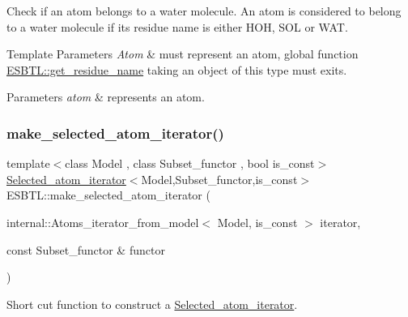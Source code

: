 Check if an atom belongs to a water molecule. An atom is considered to belong to a water molecule if its residue name is either {\ttfamily H\+OH}, {\ttfamily S\+OL} or {\ttfamily W\+AT}. 
\begin{DoxyTemplParams}{Template Parameters}
{\em Atom} & must represent an atom, global function \hyperlink{namespaceESBTL_ac67e09aee9aee533dd3953a094a52516}{E\+S\+B\+T\+L\+::get\+\_\+residue\+\_\+name} taking an object of this type must exits. \\
\hline
\end{DoxyTemplParams}

\begin{DoxyParams}{Parameters}
{\em atom} & represents an atom. \\
\hline
\end{DoxyParams}
\mbox{\label{namespaceESBTL_a1f356c0519634420b8c43f23a0513402}} 
\subsubsection{\texorpdfstring{make\+\_\+selected\+\_\+atom\+\_\+iterator()}{make\_selected\_atom\_iterator()}\hspace{0.1cm}{\footnotesize\ttfamily [1/2]}}
{\footnotesize\ttfamily template$<$class Model , class Subset\+\_\+functor , bool is\+\_\+const$>$ \\
\hyperlink{classESBTL_1_1Selected__atom__iterator}{Selected\+\_\+atom\+\_\+iterator}$<$Model,Subset\+\_\+functor,is\+\_\+const$>$ E\+S\+B\+T\+L\+::make\+\_\+selected\+\_\+atom\+\_\+iterator (\begin{DoxyParamCaption}\item[{internal\+::\+Atoms\+\_\+iterator\+\_\+from\+\_\+model$<$ Model, is\+\_\+const $>$}]{iterator,  }\item[{const Subset\+\_\+functor \&}]{functor }\end{DoxyParamCaption})}

Short cut function to construct a \hyperlink{classESBTL_1_1Selected__atom__iterator}{Selected\+\_\+atom\+\_\+iterator}. \mbox{\label{namespaceESBTL_a1e2d083df31e32a185e592a83b4f0741}} 
